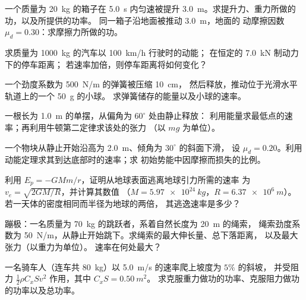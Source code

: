 \begin{exercise}[$\star$]\label{exo:b1:work-and-energy:1}
一个质量为 \qty{20}{kg} 的箱子在
\qty{5.0}{s} 内匀速被提升 \qty{3.0}{m}。求提升力、重力所做的功，以及所提供的功率。
同一箱子沿地面被推动 \qty{3.0}{m}，地面的
动摩擦因数 $\mu_d = 0.30$：求摩擦力所做的功。
\end{exercise}

\begin{exercise}[$\star$]\label{exo:b1:work-and-energy:2}
求质量为 \qty{1000}{kg} 的汽车以 \qty{100}{km/h} 行驶时的动能；
在恒定的 \qty{7.0}{kN} 制动力下的停车距离；
若速率加倍，则停车距离将如何变化？
\end{exercise}

\begin{exercise}[$\star$]\label{exo:b1:work-and-energy:3}
一个劲度系数为 \qty{500}{N/m} 的弹簧被压缩 \qty{10}{cm}，
然后释放，推动位于光滑水平轨道上的一个 \qty{50}{g} 的小球。
求弹簧储存的能量以及小球的速率。
\end{exercise}

\begin{exercise}[$\star$]\label{exo:b1:work-and-energy:4}
一根长为 \qty{1.0}{m} 的单摆，从偏角为 $60^\circ$ 处由静止释放：
利用能量求最低点的速率；再利用牛顿第二定律求该处的张力
（以 $mg$ 为单位）。
\end{exercise}

\begin{exercise}[$\star\star$]\label{exo:b1:work-and-energy:5}
一个物块从静止开始沿高为 \qty{2.0}{m}、倾角为 $30^\circ$ 的斜面下滑，
设 $\mu_d = 0.20$。利用动能定理求其到达底部时的速率；求
初始势能中因摩擦而损失的比例。
\end{exercise}

\begin{exercise}[$\star\star$]\label{exo:b1:work-and-energy:6}
利用 $E_p = -GMm/r$，证明从地球表面逃离地球引力所需的速率
为 $v_e = \sqrt{2GM/R}$，并计算其数值
（$M = \qty{5.97e24}{kg}$，$R = \qty{6.37e6}{m}$）。若一天体的密度相同而半径为地球的两倍，
其逃逸速率是多少？
\end{exercise}

\begin{exercise}[$\star\star$]\label{exo:b1:work-and-energy:7}
蹦极：一名质量为 \qty{70}{kg} 的跳跃者，系着自然长度为 \qty{20}{m} 的绳索，
绳索劲度系数为 \qty{50}{N/m}，从静止开始跳下。求绳索的最大伸长量、总下落距离，
以及最大张力（以重力为单位）。
速率在何处最大？
\end{exercise}

\begin{exercise}[$\star\star$]\label{exo:b1:work-and-energy:8}
一名骑车人（连车共 \qty{80}{kg}）以 \qty{5.0}{m/s} 的速率爬上坡度为 $5\%$ 的斜坡，
并受阻力 $\tfrac12\rho C_xSv^2$ 作用，其中 $C_xS = \qty{0.50}{m^2}$。
求克服重力做功的功率、克服阻力做功的功率以及总功率。
\end{exercise}

